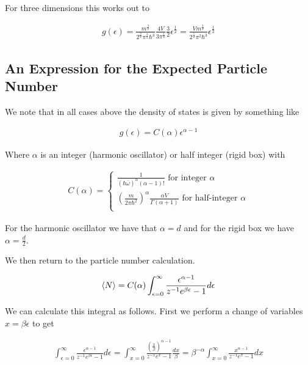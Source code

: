 \documentclass[12pt]{article}
\newcommand{\ep}{\epsilon}
\begin{document}
For three dimensions this works out to

\begin{align}
g(\ep) = \frac{m^\frac{3}{2}}{2^{\frac{3}{2}} \pi^{\frac{3}{2}} \hbar^3} \frac{4V}{3\pi^{\frac{1}{2}}} \frac{3}{2} \ep^{\frac{1}{2}} = \frac{V m^{\frac{3}{2}}}{2^{\frac{1}{2}} \pi^2 \hbar^3} \ep^{\frac{1}{2}}
\end{align}

\subsection{An Expression for the Expected Particle Number}

We note that in all cases above the density of states is given by something like

\begin{align}
g(\ep) = C(\alpha)\ep^{\alpha-1}
\end{align}

Where $\alpha$ is an integer (harmonic oscillator) or half integer (rigid box) with

\begin{align}
C(\alpha) = \begin{cases}
\frac{1}{(\hbar\bar{\omega})^\alpha (\alpha-1)!} \text{ for integer } \alpha\\
\left(\frac{m}{2\pi\hbar^2}\right)^{\alpha} \frac{\alpha V}{\Gamma(\alpha+1)} \text{ for half-integer } \alpha\\
\end{cases}
\end{align}

For the harmonic oscillator we have that $\alpha = d$ and for the rigid box we have $\alpha = \frac{d}{2}$.

We then return to the particle number calculation.



\begin{align}
\Braket{N} = C(\alpha) \int_{\ep=0}^{\infty} \frac{\ep^{\alpha-1}}{z^{-1}e^{\beta \ep}-1} d\ep
\end{align}

We can calculate this integral as follows. First we perform a change of variables $x = \beta \ep$ to get

\begin{align}
\int_{\ep=0}^{\infty} \frac{\ep^{\alpha-1}}{z^{-1}e^{\beta \ep}-1} d\ep = \int_{x=0}^{\infty}\frac{\left(\frac{x}{\beta}\right)^{\alpha-1}}{z^{-1}e^x -1}\frac{dx}{\beta} = \beta^{-\alpha} \int_{x=0}^{\infty} \frac{x^{\alpha-1}}{z^{-1}e^x-1} dx
\end{align}
\end{document}
